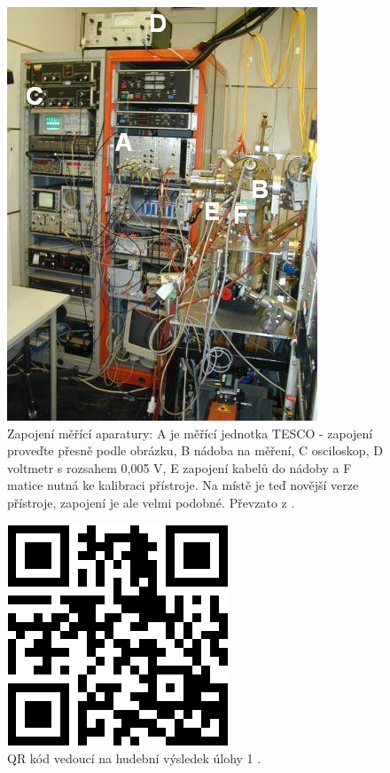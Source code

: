 \documentclass[english]{article}
\begin{document}
	\begin{figure}[h!]
	\begin{center}
	    \includegraphics[width=0.45\linewidth]{./att/aparatura.jpg}
	    	\caption{Zapojení měřící aparatury: A je měřící jednotka TESCO - zapojení proveďte přesně podle obrázku, B nádoba na měření, C osciloskop, D voltmetr s rozsahem 0,005 V, E zapojení kabelů do nádoby a F matice nutná ke kalibraci přístroje. Na místě je teď novější verze přístroje, zapojení je ale velmi podobné. Převzato z \cite{bib:protokol}.}
			\label{fig:o_1}
	\end{center}
	\end{figure}
	


		\begin{figure}[h!]
		\begin{center}
		    \includegraphics[width=0.2\linewidth]{./att/qrcode.png}
		    	\caption{QR kód vedoucí na hudební výsledek úlohy 1 \cite{bib:sound}.}
				\label{fig:qr}
		\end{center}
		\end{figure}





\end{document}
